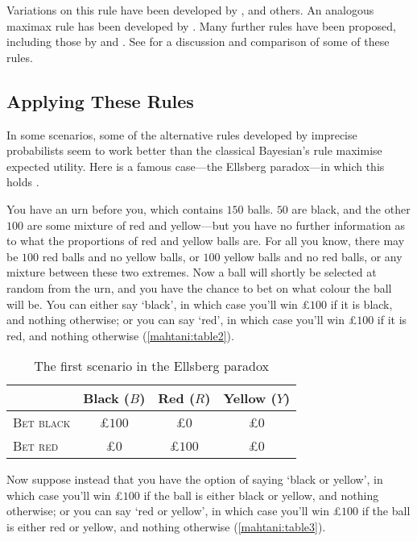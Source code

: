 Variations on this rule have been developed by \citet{gardenforssahlin1982,gilboaschmeidler1989}, and others. An analogous maximax rule has been developed by \citet{satialave1973}. Many further rules have been proposed, including those by \citet{arrowhurwicz1972} and \citet{Ellsberg1961}. See \citet{Troffaes2007} for a discussion and comparison of some of these rules. 


\subsection{Applying These Rules}

In some scenarios, some of the alternative rules developed by imprecise probabilists seem to work better than the classical Bayesian's rule maximise expected utility. Here is a famous case---the Ellsberg paradox---in which this holds \citep{Ellsberg1961}.
 
You have an urn before you, which contains $150$ balls. $50$ are black, and the other $100$ are some mixture of red and yellow---but you have no further information as to what the proportions of red and yellow balls are. For all you know, there may be $100$ red balls and no yellow balls, or $100$ yellow balls and no red balls, or any mixture between these two extremes. Now a ball will shortly be selected at random from the urn, and you have the chance to bet on what colour the ball will be. You can either say `black', in which case you'll win £$100$ if it is black, and nothing otherwise; or you can say `red', in which case you'll win £$100$ if it is red, and nothing otherwise (\autoref{mahtani:table2}). 

\begin{table}[ht]
\centering
  \begin{tabular}{lccc}
    \hline
                       & Black ($B$) & Red ($R$) & Yellow ($Y$) \\\hline\hline
    \textsc{Bet black} & £$100$ & £$0$ & £$0$\\
    \textsc{Bet red}   & £$0$ & £$100$ & £$0$\\ 
    \hline
  \end{tabular}
\caption{The first scenario in the Ellsberg paradox}
\label{mahtani:table2}
\end{table}

Now suppose instead that you have the option of saying `black or yellow', in which case you'll win £$100$ if the ball is either black or yellow, and nothing otherwise; or you can say `red or yellow', in which case you'll win £$100$ if the ball is either red or yellow, and nothing otherwise (\autoref{mahtani:table3}).

